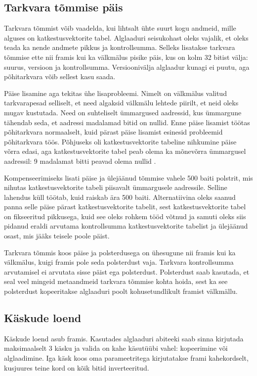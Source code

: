 \documentclass[12pt,a4paper]{article}
\begin{document}
\subsection{Tarkvara tõmmise päis}
\label{sec:impl:header}
Tarkvara tõmmist võib vaadelda, kui lihtsalt ühte suurt kogu andmeid, mille
alguses on katkestusvektorite tabel. Alglaaduri seisukohast oleks vajalik, et
oleks teada ka nende andmete pikkus ja kontrollsumma. Selleks lisatakse
tarkvara tõmmise ette nii \gls{fram}is kui ka välkmälus pisike päis, kus on kolm 32
bitist välja: suurus, versioon ja kontrollsumma. Versioonivälja alglaadur 
kunagi ei puutu, aga põhitarkvara võib sellest kasu saada.

Päise lisamine aga tekitas ühe lisaprobleemi. Nimelt on välkmälus valitud
tarkvarapesad selliselt, et need algaksid välkmälu lehtede piirilt, et neid
oleks mugav kustutada. Need on suhteliselt ümmargused aadressid, kus ümmargune
tähendab seda, et aadressi madalamad bitid on nullid. Enne päise lisamist
töötas põhitarkvara normaalselt, kuid pärast päise lisamist esinesid probleemid
põhitarkvara töös. Põhjuseks oli katkestusvektorite tabeline nihkumine päise
võrra edasi, aga katkestusvektorite tabel peab olema ka mõnevõrra ümmargusel
aadressil: 9 madalamat bitti peavad olema nullid \cite{CM3pm}.

Kompenseerimiseks lisati päise ja ülejäänud tõmmise vahele 500
baiti polstrit, mis nihutas katkestusvektorite tabeli piisavalt
ümmargusele aadressile. Selline lahendus küll töötab, kuid raiskab ära 500 baiti.
Alternatiivina oleks saanud panna selle päise pärast katkestusvektorite tabelit,
sest katkestusvektorite tabel on fikseeritud pikkusega, kuid see oleks rohkem
tööd võtnud ja samuti oleks siis pidanud eraldi arvutama kontrollsumma
katkestusvektorite tabelist ja ülejäänud osast, mis jääks teisele poole päist.

Tarkvara tõmmis koos päise ja polsterdusega on ühesugune nii \gls{fram}is kui ka
välkmälus, kuigi \gls{fram}is pole seda polsterdust vaja. Tarkvara kontrollsumma
arvutamisel ei arvutata sisse päist ega polsterdust. Polsterdust saab kasutada,
et seal veel mingeid metaandmeid tarkvara tõmmise kohta hoida, sest ka see
polsterdust kopeeritakse alglaaduri poolt kohusetundlikult \gls{fram}ist
välkmällu.

\subsection{Käskude loend}
Käskude loend asub \gls{fram}is. Kasutades alglaaduri abiteeki saab sinna kirjutada
maksimaalselt 3 käsku ja valida on kahe käsutüübi vahel: kopeerimine või
alglaadimine. Iga käsk koos oma parameetritega kirjutatakse \gls{fram}i kahekordselt,
kusjuures teine kord on kõik bitid inverteeritud. 
\end{document}
